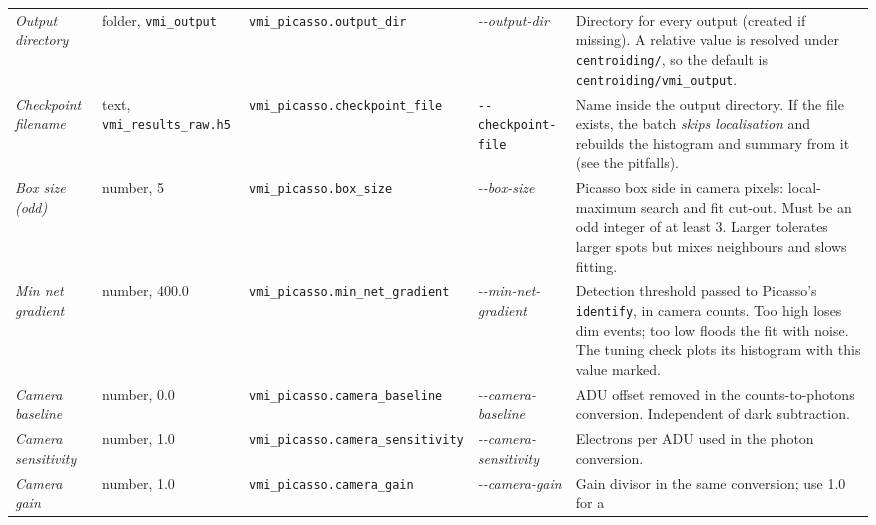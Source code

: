 \documentclass[11pt,a4paper]{article}
\newcommand{\code}[1]{\texttt{#1}}
\begin{document}
\begin{center}
\begin{longtable}{@{}L{3.4cm}L{2.3cm}L{2.5cm}L{2.8cm}L{4.9cm}@{}}
\addlinespace
\emph{Output directory} & folder, \code{vmi\_\allowbreak{}output} & \code{vmi\_\allowbreak{}picasso.\allowbreak{}output\_\allowbreak{}dir} &
\emph{-\allowbreak{}-\allowbreak{}output-\allowbreak{}dir} & Directory for every output (created if missing). A
relative value is resolved under \code{centroiding/\allowbreak{}}, so the default is
\code{centroiding/\allowbreak{}vmi\_\allowbreak{}output}. \\
\addlinespace
\emph{Checkpoint filename} & text, \code{vmi\_\allowbreak{}results\_\allowbreak{}raw.\allowbreak{}h5} &
\code{vmi\_\allowbreak{}picasso.checkpoint\_\allowbreak{}file} & \code{-\allowbreak{}-\allowbreak{}checkpoint-\allowbreak{}file} & Name inside
the output directory. If the file exists, the batch \emph{skips localisation}
and rebuilds the histogram and summary from it (see the pitfalls). \\
\addlinespace
\emph{Box size (odd)} & number, 5 & \code{vmi\_\allowbreak{}picasso.\allowbreak{}box\_\allowbreak{}size} &
\emph{-\allowbreak{}-\allowbreak{}box-\allowbreak{}size} & Picasso box side in camera pixels: local-maximum search
and fit cut-out. Must be an odd integer of at least 3. Larger tolerates
larger spots but mixes neighbours and slows fitting. \\
\addlinespace
\emph{Min net gradient} & number, 400.0 & \code{vmi\_\allowbreak{}picasso.\allowbreak{}min\_\allowbreak{}net\_\allowbreak{}gradient} &
\emph{-\allowbreak{}-\allowbreak{}min-\allowbreak{}net-\allowbreak{}gradient} & Detection threshold passed to Picasso's
\code{identify}, in camera counts. Too high loses dim events; too low floods
the fit with noise. The tuning check plots its histogram with this value
marked. \\
\addlinespace
\emph{Camera baseline} & number, 0.0 & \code{vmi\_\allowbreak{}picasso.\allowbreak{}camera\_\allowbreak{}baseline} &
\emph{-\allowbreak{}-\allowbreak{}camera-\allowbreak{}baseline} & ADU offset removed in the counts-to-photons
conversion. Independent of dark subtraction. \\
\addlinespace
\emph{Camera sensitivity} & number, 1.0 & \code{vmi\_\allowbreak{}picasso.\allowbreak{}camera\_\allowbreak{}sensitivity} &
\emph{-\allowbreak{}-\allowbreak{}camera-\allowbreak{}sensitivity} & Electrons per ADU used in the photon
conversion. \\
\addlinespace
\emph{Camera gain} & number, 1.0 & \code{vmi\_\allowbreak{}picasso.\allowbreak{}camera\_\allowbreak{}gain} &
\emph{-\allowbreak{}-\allowbreak{}camera-\allowbreak{}gain} & Gain divisor in the same conversion; use 1.0 for a

\end{longtable}
\end{center}
\end{document}
